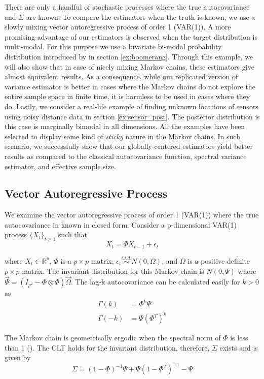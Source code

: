 \documentclass[11pt]{article}
\theoremstyle{remark}
\begin{document}
There are only a handful of stochastic processes where the true autocovariance and $\Sigma$ are known. To compare the estimators when the truth is known, we use a slowly mixing vector autoregressive process of order 1 (VAR(1)). A more promising advantage of our estimators is observed when the target distribution is multi-modal. For this purpose we use a bivariate bi-modal probability distribution introduced by \cite{gelman1991note} in section \ref{ex:boomerang}. Through this example, we will also show that in case of nicely mixing Markov chains, these estimators give almost equivalent results. As a consequence, while out replicated version of variance estimator is better in cases where the Markov chains do not explore the entire sample space in finite time, it is harmless to be used in cases where they do. Lastly, we consider a real-life example of finding unknown locations of sensors using noisy distance data in section \ref{ex:sensor_post}. The posterior distribution is this case is marginally bimodal in all dimensions. All the examples have been selected to display some kind of \textit{sticky} nature in the Markov chains. In such scenario, we successfully show that our globally-centered estimators yield better results as compared to the classical autocovariance function, spectral variance estimator, and effective sample size.


\subsection{Vector Autoregressive Process} \label{ex:var}

We examine the vector autoregressive process of order 1 (VAR(1)) where the true autocovariance in known in closed form. Consider a p-dimensional VAR(1) process $\{X_t\}_{t \geq 1}$ such that
%
\[
X_t = \Phi X_{t-1} + \epsilon_t
\]

where $X_t \in \mathbb{R}^p$, $\Phi $ is a $p \times p $ matrix, $ \epsilon_t \overset{i.i.d.}{\sim} N(0, \Omega)$, and $\Omega$ is a positive definite $p \times p$ matrix. The invariant distribution for this Markov chain is $N(0, \Psi)$ where $\Vec{\Psi} = (I_{p^2} - \Phi \otimes \Phi)\Vec{\Omega}$. The lag-k autocovariance can be calculated easily for $k >0$ as
%
\begin{align*}
    \Gamma(k) &= \Phi^k\Psi\\
    \Gamma(-k) &= \Psi(\Phi^T)^k
\end{align*}

The Markov chain is geometrically ergodic when the spectral norm of $\Phi$ is less than 1 (\cite{10.2307/1427459}). The CLT holds for the invariant distribution, therefore, $\Sigma$ exists and is given by
%
\[
\Sigma = (1 - \Phi)^{-1}\Psi + \Psi(1 - \Phi^T)^{-1} - \Psi
\]
\end{document}
